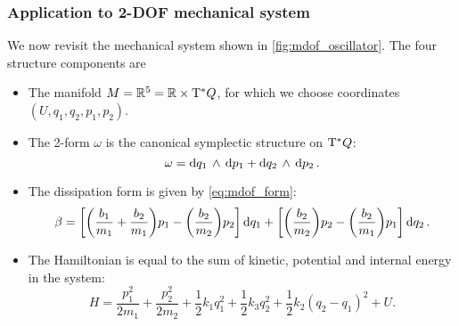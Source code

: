 \subsubsection{Application to 2-DOF mechanical system}
We now revisit the mechanical system shown in \cref{fig:mdof_oscillator}. The four structure components are
\begin{itemize}
    \item The manifold \(M = \mathbb{R}^5 = \mathbb{R} \times \mathrm{T}^*Q\), for which we choose coordinates \((U, q_1, q_2, p_1, p_2)\).
    \item The 2-form \(\omega\) is the canonical symplectic structure on \(\mathrm{T}^*Q\):
        \begin{equation}
     \omega =  \dd{q_1}\,\wedge\,\dd{p_1}  +  \dd{q_2}\,\wedge\,\dd{p_2} .
\end{equation}
    \item The dissipation form is given by \cref{eq:mdof_form}:
        \begin{equation}
     \beta =  \qty[\qty(\frac{b_1}{m_1} + \frac{b_2}{m_1}) p_1 - \qty(\frac{b_2}{m_2})p_2]\dd{q_1}
                          + \qty[\qty(\frac{b_2}{m_2})p_2 - \qty(\frac{b_2}{m_1})p_1]\dd{q_2}.
\end{equation}
    \item The Hamiltonian is equal to the sum of kinetic, potential and internal energy in the system:
        \begin{equation}
     H = \frac{p^2_1}{2m_1} + \frac{p^2_2}{2m_2} + \frac{1}{2}k_1q_1^2 + \frac{1}{2}k_3q_2^2 + \frac{1}{2}k_2(q_2 - q_1)^2 + U.
\end{equation}
\end{itemize}

